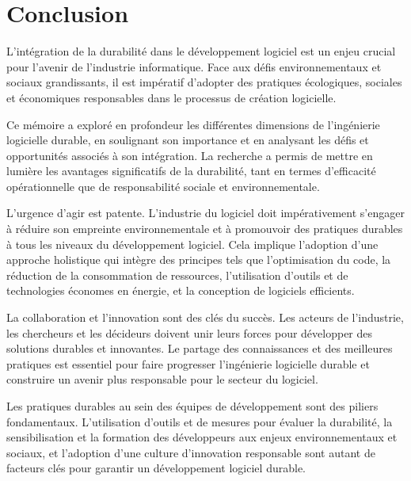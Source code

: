 
\chapter{Conclusion} 	%
\label{conclusion} 		%


L'intégration de la durabilité dans le développement logiciel est un enjeu crucial pour l'avenir de l'industrie informatique. Face aux défis environnementaux et sociaux grandissants, il est impératif d'adopter des pratiques écologiques, sociales et économiques responsables dans le processus de création logicielle.

Ce mémoire a exploré en profondeur les différentes dimensions de l'ingénierie logicielle durable, en soulignant son importance et en analysant les défis et opportunités associés à son intégration. La recherche a permis de mettre en lumière les avantages significatifs de la durabilité, tant en termes d'efficacité opérationnelle que de responsabilité sociale et environnementale.

L'urgence d'agir est patente. L'industrie du logiciel doit impérativement s'engager à réduire son empreinte environnementale et à promouvoir des pratiques durables à tous les niveaux du développement logiciel. Cela implique l'adoption d'une approche holistique qui intègre des principes tels que l'optimisation du code, la réduction de la consommation de ressources, l'utilisation d'outils et de technologies économes en énergie, et la conception de logiciels efficients.

La collaboration et l'innovation sont des clés du succès. Les acteurs de l'industrie, les chercheurs et les décideurs doivent unir leurs forces pour développer des solutions durables et innovantes. Le partage des connaissances et des meilleures pratiques est essentiel pour faire progresser l'ingénierie logicielle durable et construire un avenir plus responsable pour le secteur du logiciel.

Les pratiques durables au sein des équipes de développement sont des piliers fondamentaux. L'utilisation d'outils et de mesures pour évaluer la durabilité, la sensibilisation et la formation des développeurs aux enjeux environnementaux et sociaux, et l'adoption d'une culture d'innovation responsable sont autant de facteurs clés pour garantir un développement logiciel durable.

